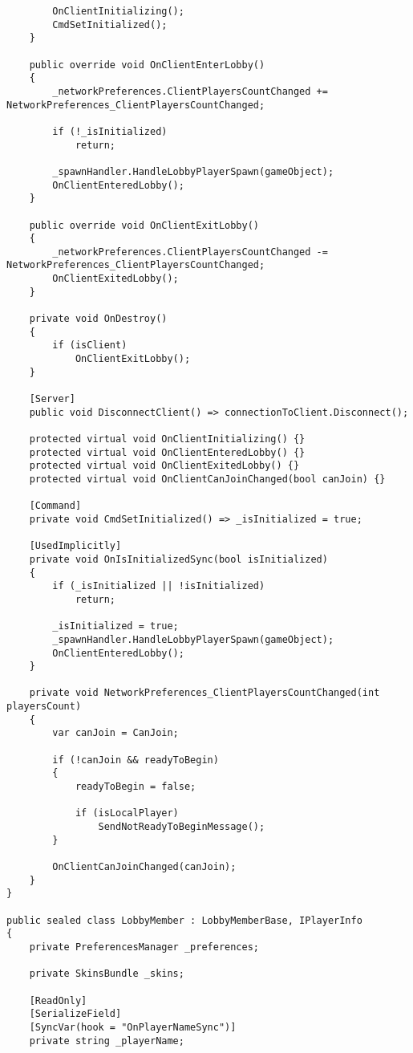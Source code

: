 \begin{lstlisting}
        OnClientInitializing();
        CmdSetInitialized();
    }

    public override void OnClientEnterLobby()
    {
        _networkPreferences.ClientPlayersCountChanged += NetworkPreferences_ClientPlayersCountChanged;

        if (!_isInitialized)
            return;

        _spawnHandler.HandleLobbyPlayerSpawn(gameObject);
        OnClientEnteredLobby();
    }

    public override void OnClientExitLobby()
    {
        _networkPreferences.ClientPlayersCountChanged -= NetworkPreferences_ClientPlayersCountChanged;
        OnClientExitedLobby();
    }

    private void OnDestroy()
    {
        if (isClient)
            OnClientExitLobby();
    }

    [Server]
    public void DisconnectClient() => connectionToClient.Disconnect();

    protected virtual void OnClientInitializing() {}
    protected virtual void OnClientEnteredLobby() {}
    protected virtual void OnClientExitedLobby() {}
    protected virtual void OnClientCanJoinChanged(bool canJoin) {}

    [Command]
    private void CmdSetInitialized() => _isInitialized = true;

    [UsedImplicitly]
    private void OnIsInitializedSync(bool isInitialized)
    {
        if (_isInitialized || !isInitialized)
            return;

        _isInitialized = true;
        _spawnHandler.HandleLobbyPlayerSpawn(gameObject);
        OnClientEnteredLobby();
    }

    private void NetworkPreferences_ClientPlayersCountChanged(int playersCount)
    {
        var canJoin = CanJoin;

        if (!canJoin && readyToBegin)
        {
            readyToBegin = false;

            if (isLocalPlayer)
                SendNotReadyToBeginMessage();
        }

        OnClientCanJoinChanged(canJoin);
    }
}

public sealed class LobbyMember : LobbyMemberBase, IPlayerInfo
{
    private PreferencesManager _preferences;

    private SkinsBundle _skins;

    [ReadOnly]
    [SerializeField]
    [SyncVar(hook = "OnPlayerNameSync")]
    private string _playerName;


\end{lstlisting}
